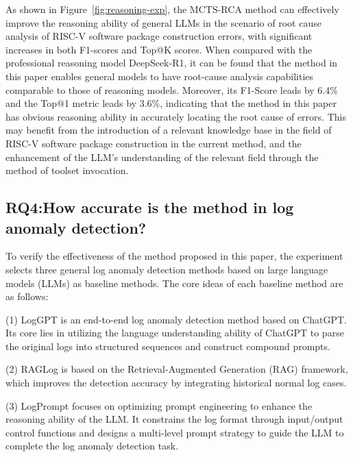 \documentclass[10pt,conference]{IEEEtran}
\begin{document}
As shown in Figure~\ref{fig:reasoning-exp}, the MCTS-RCA method can effectively improve the reasoning ability of general LLMs in the scenario of root cause analysis of RISC-V software package construction errors, with significant increases in both F1-scores and Top@K scores. When compared with the professional reasoning model DeepSeek-R1, it can be found that the method in this paper enables general models to have root-cause analysis capabilities comparable to those of reasoning models. Moreover, its F1-Score leads by 6.4\% and the Top@1 metric leads by 3.6\%, indicating that the method in this paper has obvious reasoning ability in accurately locating the root cause of errors. This may benefit from the introduction of a relevant knowledge base in the field of RISC-V software package construction in the current method, and the enhancement of the LLM's understanding of the relevant field through the method of toolset invocation. 

\subsection{RQ4:How accurate is the method in log anomaly detection?}\label{sec:rq4}

To verify the effectiveness of the method proposed in this paper, the experiment selects three general log anomaly detection methods based on large language models (LLMs) as baseline methods. The core ideas of each baseline method are as follows:

(1) LogGPT is an end-to-end log anomaly detection method based on ChatGPT. Its core lies in utilizing the language understanding ability of ChatGPT to parse the original logs into structured sequences and construct compound prompts.

(2) RAGLog is based on the Retrieval-Augmented Generation (RAG) framework, which improves the detection accuracy by integrating historical normal log cases. 

(3) LogPrompt focuses on optimizing prompt engineering to enhance the reasoning ability of the LLM. It constrains the log format through input/output control functions and designs a multi-level prompt strategy to guide the LLM to complete the log anomaly detection task. 
\end{document}
